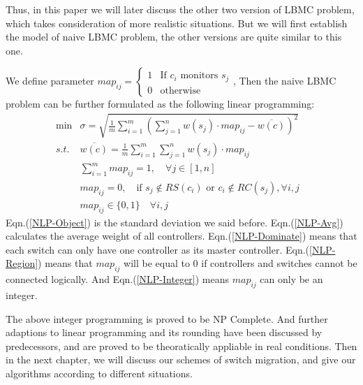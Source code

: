 Thus, in this paper we will later discuss the other two version of LBMC problem, which takes consideration of more realistic situations. But we will first establish the model of naive LBMC problem, the other versions are quite similar to this one.

We define parameter $map_{ij}=\left\{\begin{array}{ll}1 & \mbox{If } c_i \mbox{ monitors } s_j \\ 0 & \mbox{otherwise}\end{array}\right.$, Then the naive LBMC problem can be further formulated as the following linear programming:
\begin{eqnarray}
\min & \sigma=\sqrt{\frac{1}{m}\sum_{i=1}^{m} \left(\sum_{j=1}^n w(s_j)\cdot map_{ij}-\overline{w(c)}\right)^2} & \label{NLP-Object}\\
s.t. & \overline{w(c)}=\frac{1}{m}\sum_{i=1}^m \sum_{j=1}^n w(s_j)\cdot map_{ij} \label{NLP-Avg}\\
     & \sum_{i=1}^m map_{ij}=1, \quad \forall j \in [1, n] \label{NLP-Dominate} \\
     & map_{ij}=0, \quad \mbox{if } s_j \not\in RS(c_i) \mbox{ or } c_i \not\in RC(s_j), \forall i,j \label{NLP-Region}\\
     & map_{ij} \in \{0,1\} \quad \forall i, j \label{NLP-Integer}
\end{eqnarray}
Eqn.(\ref{NLP-Object}) is the standard deviation we said before. Eqn.(\ref{NLP-Avg}) calculates the average weight of all controllers. Eqn.(\ref{NLP-Dominate}) means that each switch can only have one controller as its master controller. Eqn.(\ref{NLP-Region}) means that $map_{ij}$ will be equal to 0 if controllers and switches cannot be connected logically. And Eqn.(\ref{NLP-Integer}) means $map_{ij}$ can only be an integer.

The above integer programming is proved to be NP Complete. And further adaptions to linear programming and its rounding have been discussed by predecessors, and are proved to be theoratically appliable in real conditions. Then in the next chapter, we will discuss our schemes of switch migration, and give our algorithms according to different situations.
